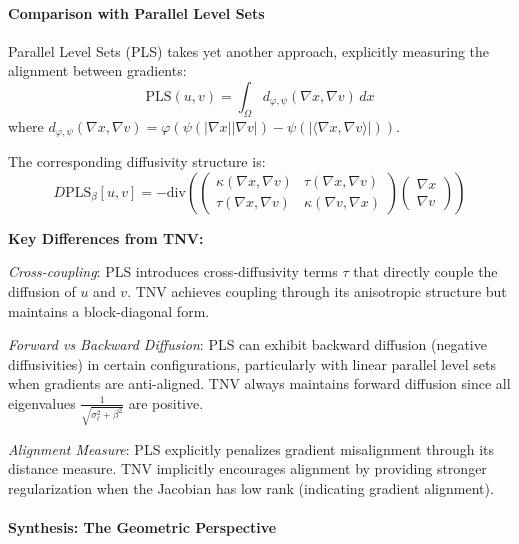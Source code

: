 \paragraph{Comparison with Parallel Level Sets}

Parallel Level Sets (PLS) takes yet another approach, explicitly measuring the alignment between gradients:
\begin{equation}
\text{PLS}(u,v) = \int_\Omega d_{\varphi,\psi}(\nabla x, \nabla v) \, dx
\end{equation}
where $d_{\varphi,\psi}(\nabla x, \nabla v) = \varphi(\psi(|\nabla x||\nabla v|) - \psi(|\langle \nabla x, \nabla v \rangle|))$.

The corresponding diffusivity structure is:
\begin{equation}
D\text{PLS}_\beta[u,v] = -\text{div}\left(\begin{pmatrix} \kappa(\nabla x,\nabla v) & \tau(\nabla x,\nabla v) \\ \tau(\nabla x,\nabla v) & \kappa(\nabla v,\nabla x) \end{pmatrix} \begin{pmatrix} \nabla x \\ \nabla v \end{pmatrix}\right)
\end{equation}

\textbf{Key Differences from TNV:}

\emph{Cross-coupling}: PLS introduces cross-diffusivity terms $\tau$ that directly couple the diffusion of $u$ and $v$. TNV achieves coupling through its anisotropic structure but maintains a block-diagonal form.

\emph{Forward vs Backward Diffusion}: PLS can exhibit backward diffusion (negative diffusivities) in certain configurations, particularly with linear parallel level sets when gradients are anti-aligned. TNV always maintains forward diffusion since all eigenvalues $\frac{1}{\sqrt{\sigma_\ell^2 + \beta^2}}$ are positive.

\emph{Alignment Measure}: PLS explicitly penalizes gradient misalignment through its distance measure. TNV implicitly encourages alignment by providing stronger regularization when the Jacobian has low rank (indicating gradient alignment).

\paragraph{Synthesis: The Geometric Perspective}

